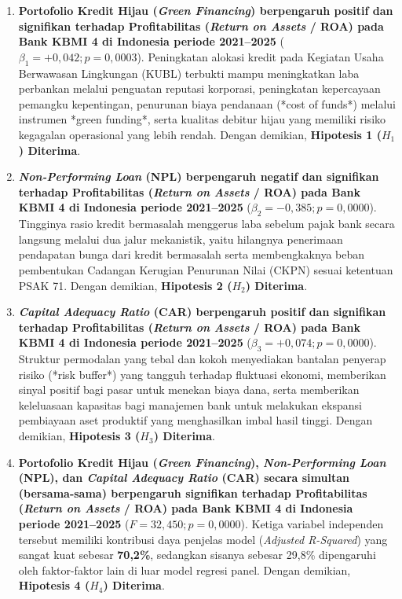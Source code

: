 \documentclass[12pt,a4paper]{article}
\numberwithin{equation}{section}
\begin{document}
\begin{enumerate}
  \item \textbf{Portofolio Kredit Hijau (\emph{Green Financing}) berpengaruh positif dan signifikan terhadap Profitabilitas (\emph{Return on Assets} / ROA) pada Bank KBMI 4 di Indonesia periode 2021--2025} ($\beta_1 = +0{,}042; p = 0{,}0003$). Peningkatan alokasi kredit pada Kegiatan Usaha Berwawasan Lingkungan (KUBL) terbukti mampu meningkatkan laba perbankan melalui penguatan reputasi korporasi, peningkatan kepercayaan pemangku kepentingan, penurunan biaya pendanaan (*cost of funds*) melalui instrumen *green funding*, serta kualitas debitur hijau yang memiliki risiko kegagalan operasional yang lebih rendah. Dengan demikian, \textbf{Hipotesis 1 ($H_1$) Diterima}.

  \item \textbf{\emph{Non-Performing Loan} (NPL) berpengaruh negatif dan signifikan terhadap Profitabilitas (\emph{Return on Assets} / ROA) pada Bank KBMI 4 di Indonesia periode 2021--2025} ($\beta_2 = -0{,}385; p = 0{,}0000$). Tingginya rasio kredit bermasalah menggerus laba sebelum pajak bank secara langsung melalui dua jalur mekanistik, yaitu hilangnya penerimaan pendapatan bunga dari kredit bermasalah serta membengkaknya beban pembentukan Cadangan Kerugian Penurunan Nilai (CKPN) sesuai ketentuan PSAK 71. Dengan demikian, \textbf{Hipotesis 2 ($H_2$) Diterima}.

  \item \textbf{\emph{Capital Adequacy Ratio} (CAR) berpengaruh positif dan signifikan terhadap Profitabilitas (\emph{Return on Assets} / ROA) pada Bank KBMI 4 di Indonesia periode 2021--2025} ($\beta_3 = +0{,}074; p = 0{,}0000$). Struktur permodalan yang tebal dan kokoh menyediakan bantalan penyerap risiko (*risk buffer*) yang tangguh terhadap fluktuasi ekonomi, memberikan sinyal positif bagi pasar untuk menekan biaya dana, serta memberikan keleluasaan kapasitas bagi manajemen bank untuk melakukan ekspansi pembiayaan aset produktif yang menghasilkan imbal hasil tinggi. Dengan demikian, \textbf{Hipotesis 3 ($H_3$) Diterima}.

  \item \textbf{Portofolio Kredit Hijau (\emph{Green Financing}), \emph{Non-Performing Loan} (NPL), dan \emph{Capital Adequacy Ratio} (CAR) secara simultan (bersama-sama) berpengaruh signifikan terhadap Profitabilitas (\emph{Return on Assets} / ROA) pada Bank KBMI 4 di Indonesia periode 2021--2025} ($F = 32{,}450; p = 0{,}0000$). Ketiga variabel independen tersebut memiliki kontribusi daya penjelas model (\emph{Adjusted R-Squared}) yang sangat kuat sebesar \textbf{70,2\%}, sedangkan sisanya sebesar 29,8\% dipengaruhi oleh faktor-faktor lain di luar model regresi panel. Dengan demikian, \textbf{Hipotesis 4 ($H_4$) Diterima}.
\end{enumerate}
\end{document}
